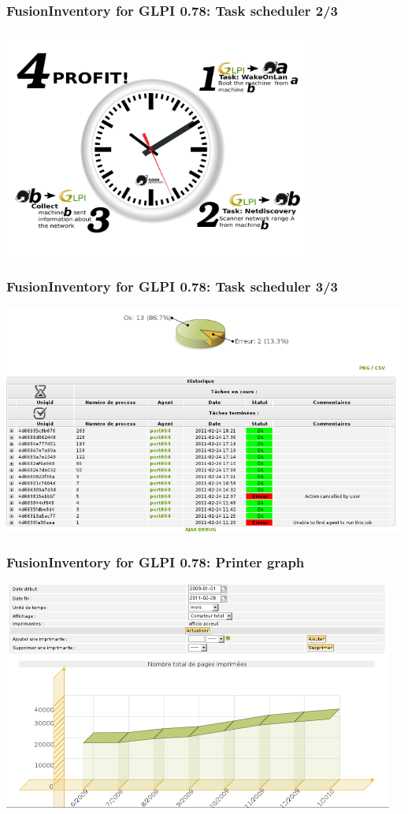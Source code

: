 \documentclass{beamer}
\begin{document}
\begin{frame}
\frametitle{FusionInventory for GLPI 0.78: Task scheduler 2/3}
    \includegraphics[height=7.5cm]{pics/fusion_task.pdf}
\end{frame}

\begin{frame}
\frametitle{FusionInventory for GLPI 0.78: Task scheduler 3/3}
    \includegraphics[height=7.5cm]{pics/walid_task_1.png}
\end{frame}

\begin{frame}
\frametitle{FusionInventory for GLPI 0.78: Printer graph}
    \includegraphics[height=7.5cm]{pics/walid_printer_2.png}
\end{frame}
%
\end{document}

